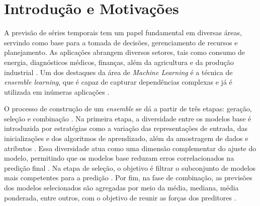 \chapter{Introdução e Motivações}
A previsão de séries temporais tem um papel fundamental em diversas áreas, servindo como base para a tomada de decisões, gerenciamento de recursos e planejamento. As aplicações abrangem diversos setores, tais como consumo de energia, diagnósticos médicos, finanças, além da agricultura e da produção industrial \cite{hallSurveyMachineLearning2025, liuForecastMethodsTime2021}. Um dos destaques da área de \textit{Machine Learning} é a técnica de \textit{ensemble learning}, que é capaz de capturar dependências complexas e já é utilizada em inúmeras aplicações \cite{carvalhoDynamicSelectionEnsemblebased2025}.

O processo de construção de um \textit{ensemble} se dá a partir de três etapas: geração, seleção e combinação \cite{mendes-moreiraEnsembleApproachesRegression2012}. Na primeira etapa, a diversidade entre os modelos base é introduzida por estratégias como a variação das representações de entrada, das inicializações e dos algoritmos de aprendizado, além da amostragem de dados e atributos \cite{fanDiverseModelsUnited2025}. Essa diversidade atua como uma dimensão complementar do ajuste do modelo, permitindo que os modelos base reduzam erros correlacionados na predição final \cite{woodUnifiedTheoryDiversity}. Na etapa de seleção, o objetivo é filtrar o subconjunto de modelos mais competentes para a predição \cite{koDynamicClassifierSelection2008}. Por fim, na fase de combinação, as previsões dos modelos selecionados são agregadas por meio da média, mediana, média ponderada, entre outros, com o objetivo de reunir as forças dos preditores \cite{allendeEnsembleMethodsTime2016}.



